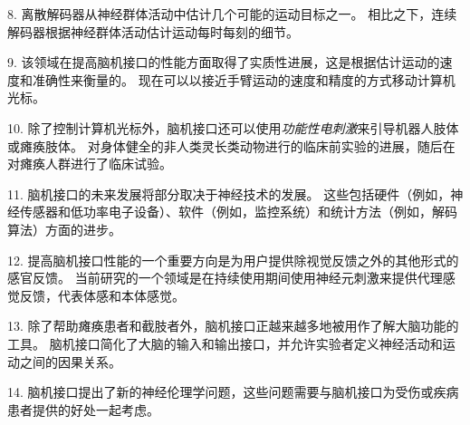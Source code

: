8. 离散解码器从神经群体活动中估计几个可能的运动目标之一。
相比之下，连续解码器根据神经群体活动估计运动每时每刻的细节。


9. 该领域在提高脑机接口的性能方面取得了实质性进展，这是根据估计运动的速度和准确性来衡量的。
现在可以以接近手臂运动的速度和精度的方式移动计算机光标。


10. 除了控制计算机光标外，脑机接口还可以使用\textit{功能性电刺激}来引导机器人肢体或瘫痪肢体。
对身体健全的非人类灵长类动物进行的临床前实验的进展，随后在对瘫痪人群进行了临床试验。


11. 脑机接口的未来发展将部分取决于神经技术的发展。
这些包括硬件（例如，神经传感器和低功率电子设备）、软件（例如，监控系统）和统计方法（例如，解码算法）方面的进步。


12. 提高脑机接口性能的一个重要方向是为用户提供除视觉反馈之外的其他形式的感官反馈。
当前研究的一个领域是在持续使用期间使用神经元刺激来提供代理感觉反馈，代表体感和本体感觉。


13. 除了帮助瘫痪患者和截肢者外，脑机接口正越来越多地被用作了解大脑功能的工具。
脑机接口简化了大脑的输入和输出接口，并允许实验者定义神经活动和运动之间的因果关系。


14. 脑机接口提出了新的神经伦理学问题，这些问题需要与脑机接口为受伤或疾病患者提供的好处一起考虑。

